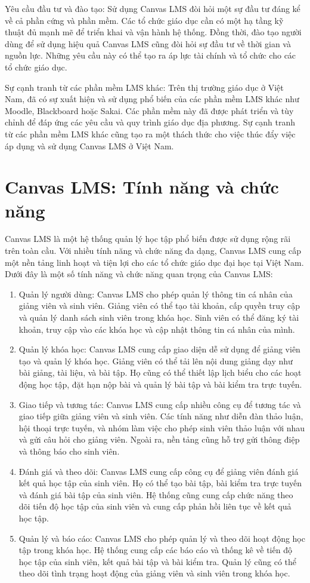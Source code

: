 \documentclass[../Thesis.tex]{subfiles}
\begin{document}
		Yêu cầu đầu tư và đào tạo: Sử dụng Canvas LMS đòi hỏi một sự đầu tư đáng kể về cả phần cứng và phần mềm. Các tổ chức giáo dục cần có một hạ tầng kỹ thuật đủ mạnh mẽ để triển khai và vận hành hệ thống. Đồng thời, đào tạo người dùng để sử dụng hiệu quả Canvas LMS cũng đòi hỏi sự đầu tư về thời gian và nguồn lực. Những yêu cầu này có thể tạo ra áp lực tài chính và tổ chức cho các tổ chức giáo dục.

		Sự cạnh tranh từ các phần mềm LMS khác: Trên thị trường giáo dục ở Việt Nam, đã có sự xuất hiện và sử dụng phổ biến của các phần mềm LMS khác như Moodle, Blackboard hoặc Sakai. Các phần mềm này đã được phát triển và tùy chỉnh để đáp ứng các yêu cầu và quy trình giáo dục địa phương. Sự cạnh tranh từ các phần mềm LMS khác cũng tạo ra một thách thức cho việc thúc đẩy việc áp dụng và sử dụng Canvas LMS ở Việt Nam.
\section{Canvas LMS: Tính năng và chức năng}
Canvas LMS là một hệ thống quản lý học tập phổ biến được sử dụng rộng rãi trên toàn cầu. Với nhiều tính năng và chức năng đa dạng, Canvas LMS cung cấp một nền tảng linh hoạt và tiện lợi cho các tổ chức giáo dục đại học tại Việt Nam. Dưới đây là một số tính năng và chức năng quan trọng của Canvas LMS:

\begin{enumerate}
	\item Quản lý người dùng: Canvas LMS cho phép quản lý thông tin cá nhân của giảng viên và sinh viên. Giảng viên có thể tạo tài khoản, cấp quyền truy cập và quản lý danh sách sinh viên trong khóa học. Sinh viên có thể đăng ký tài khoản, truy cập vào các khóa học và cập nhật thông tin cá nhân của mình.
	\item Quản lý khóa học: Canvas LMS cung cấp giao diện dễ sử dụng để giảng viên tạo và quản lý khóa học. Giảng viên có thể tải lên nội dung giảng dạy như bài giảng, tài liệu, và bài tập. Họ cũng có thể thiết lập lịch biểu cho các hoạt động học tập, đặt hạn nộp bài và quản lý bài tập và bài kiểm tra trực tuyến.
	\item Giao tiếp và tương tác: Canvas LMS cung cấp nhiều công cụ để tương tác và giao tiếp giữa giảng viên và sinh viên. Các tính năng như diễn đàn thảo luận, hội thoại trực tuyến, và nhóm làm việc cho phép sinh viên thảo luận với nhau và gửi câu hỏi cho giảng viên. Ngoài ra, nền tảng cũng hỗ trợ gửi thông điệp và thông báo cho sinh viên.
	\item Đánh giá và theo dõi: Canvas LMS cung cấp công cụ để giảng viên đánh giá kết quả học tập của sinh viên. Họ có thể tạo bài tập, bài kiểm tra trực tuyến và đánh giá bài tập của sinh viên. Hệ thống cũng cung cấp chức năng theo dõi tiến độ học tập của sinh viên và cung cấp phản hồi liên tục về kết quả học tập.
	\item Quản lý và báo cáo: Canvas LMS cho phép quản lý và theo dõi hoạt động học tập trong khóa học. Hệ thống cung cấp các báo cáo và thống kê về tiến độ học tập của sinh viên, kết quả bài tập và bài kiểm tra. Quản lý cũng có thể theo dõi tình trạng hoạt động của giảng viên và sinh viên trong khóa học.
\end{enumerate}
\end{document}
